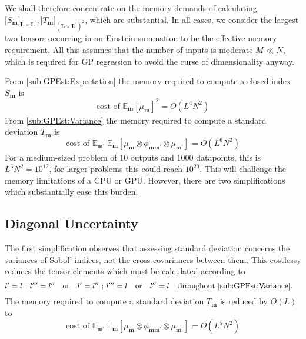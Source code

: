 \documentclass[preprint,12pt]{elsarticle}
\newcommand*{\M}[1]{\ensuremath{#1}\xspace}
\newcommand*{\x}{\times}
\newcommand*{\mi}[1]{\mathbf{#1}}
\newcommand*{\te}[2][]{\left\lbrack{#2}\right\rbrack_{#1}}
\newcommand*{\tte}[2][]{\lbrack{#2}\rbrack_{#1}}
\newcommand{\T}[1]{\text{#1}}
\newcommand*{\QT}[2][]{\M{\quad\T{#2}\ifthenelse{\equal{#1}{}}{\quad}{#1}}}
\newcommand*{\evt}[3][]{\mathbb{E}_{#3}^{#1}\!#2}
\begin{document}
    We shall therefore concentrate on the memory demands of calculating $\tte[\mi{L\x L^{\prime}}]{S_{\mi{m}}},\tte[(\mi{L\x L^{\prime}})^{2}]{T_{\mi{m}}}$, which are substantial. In all cases, we consider the largest two tensors occurring in an Einstein summation to be the effective memory requirement. All this assumes that the number of inputs is moderate $M \ll N$, which is required for GP regression to avoid the curse of dimensionality \cite{Bellman1966,Binois2021} anyway.

    From \cref{sub:GPEst:Expectation} the memory required to compute a closed index $S_{\mi{m}}$ is
    \begin{equation*}
        \T{cost of }\evt{\te[]{\mu_{\mi{m}}}^{2}}{\mi{m}} = O(L^{4}N^{2})
    \end{equation*}
    From \cref{sub:GPEst:Variance} the memory required to compute a standard deviation $T_{\mi{m}}$ is
    \begin{equation*}
        \T{cost of }\evt{\;\evt{\te[]{\mu_{\mi{m}} \otimes \phi_{\mi{mm^{\prime}}} \otimes \mu_{\mi{m^{\prime}}}}}}{\mi{m^{\prime}}}{\mi{m}} = O(L^{6}N^{2})
    \end{equation*}
    For a medium-sized problem of 10 outputs and 1000 datapoints, this is $L^{6}N^{2}=10^{12}$, for larger problems this could reach $10^{20}$. This will challenge the memory limitations of a CPU or GPU. However, there are two simplifications which substantially ease this burden.

    \subsection{Diagonal Uncertainty}\label{sub:Complexity:Diag}
    The first simplification observes that assessing standard deviation concerns the variances of Sobol' indices, not the cross covariances between them. This costlessy reduces the tensor elements which must be calculated according to
    \begin{equation*}
        l^{\prime} = l \T{ ; } l^{\prime\prime\prime} = l^{\prime\prime} \QT{or} 
        l^{\prime} = l^{\prime\prime} \T{ ; } l^{\prime\prime\prime} = l  \QT{or} l^{\prime\prime} = l 
        \QT{throughout \cref{sub:GPEst:Variance}.}   
    \end{equation*}
    The memory required to compute a standard deviation $T_{\mi{m}}$ is reduced by $O(L)$ to
    \begin{equation*}
        \T{cost of }\evt{\;\evt{\te[]{\mu_{\mi{m}} \otimes \phi_{\mi{mm^{\prime}}} \otimes \mu_{\mi{m^{\prime}}}}}}{\mi{m^{\prime}}}{\mi{m}} = O(L^{5}N^{2})
    \end{equation*}
\end{document}
